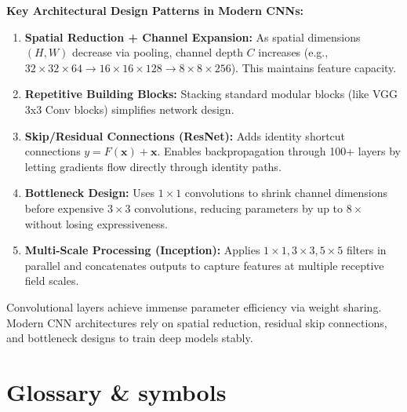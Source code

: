 \documentclass[a4paper,11pt]{article}
\begin{document}
\noindent\textbf{Key Architectural Design Patterns in Modern CNNs:}
\begin{enumerate}[leftmargin=1.5em]
  \item \textbf{Spatial Reduction + Channel Expansion:} As spatial dimensions $(H, W)$ decrease via pooling, channel depth $C$ increases (e.g., $32\times32\times64 \to 16\times16\times128 \to 8\times8\times256$). This maintains feature capacity.
  \item \textbf{Repetitive Building Blocks:} Stacking standard modular blocks (like VGG 3x3 Conv blocks) simplifies network design.
  \item \textbf{Skip/Residual Connections (ResNet):} Adds identity shortcut connections $y = F(\mathbf{x}) + \mathbf{x}$. Enables backpropagation through 100+ layers by letting gradients flow directly through identity paths.
  \item \textbf{Bottleneck Design:} Uses $1 \times 1$ convolutions to shrink channel dimensions before expensive $3 \times 3$ convolutions, reducing parameters by up to $8\times$ without losing expressiveness.
  \item \textbf{Multi-Scale Processing (Inception):} Applies $1\times1, 3\times3, 5\times5$ filters in parallel and concatenates outputs to capture features at multiple receptive field scales.
\end{enumerate}

\begin{keytake}
Convolutional layers achieve immense parameter efficiency via weight sharing. Modern CNN architectures rely on spatial reduction, residual skip connections, and bottleneck designs to train deep models stably.
\end{keytake}


\section*{Glossary \& symbols}
\end{document}
